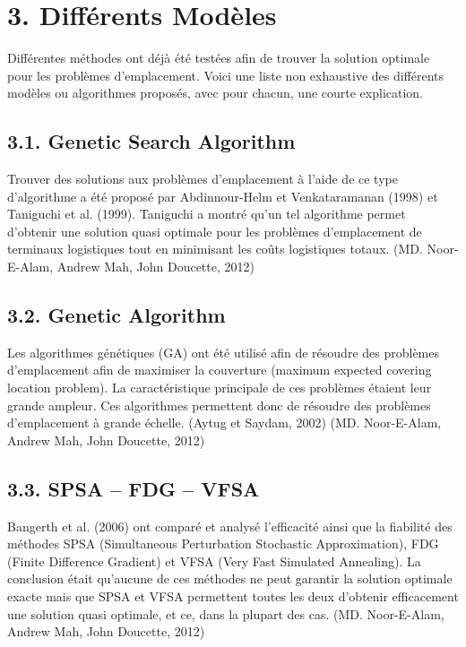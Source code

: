 \section*{3. Différents Modèles}

\bigskip

Différentes méthodes ont déjà été testées afin de trouver la solution optimale pour les problèmes d'emplacement. Voici une liste non exhaustive des différents modèles ou algorithmes proposés, avec pour chacun, une courte explication.

\subsection*{3.1. Genetic Search Algorithm}

\bigskip

Trouver des solutions aux problèmes d'emplacement à l'aide de ce type d'algorithme a été proposé par Abdinnour-Helm et Venkataramanan (1998) et Taniguchi et al. (1999). Taniguchi a montré qu'un tel algorithme permet d'obtenir une solution quasi optimale pour les problèmes d'emplacement de terminaux logistiques tout en minimisant les coûts logistiques totaux. (MD. Noor-E-Alam, Andrew Mah, John Doucette, 2012)

\subsection*{3.2. Genetic Algorithm}

\bigskip

Les algorithmes génétiques (GA) ont été utilisé afin de résoudre des problèmes d'emplacement afin de maximiser la couverture (maximum expected covering location problem). La caractéristique principale de ces problèmes étaient leur grande ampleur. Ces algorithmes permettent donc de résoudre des problèmes d'emplacement à grande échelle. (Aytug et Saydam, 2002) (MD. Noor-E-Alam, Andrew Mah, John Doucette, 2012)

\subsection*{3.3. SPSA – FDG – VFSA}

\bigskip

Bangerth et al. (2006) ont comparé et analysé l'efficacité ainsi que la fiabilité des méthodes SPSA (Simultaneous Perturbation Stochastic Approximation), FDG (Finite Difference Gradient) et VFSA (Very Fast Simulated Annealing). La conclusion était qu'aucune de ces méthodes ne peut garantir la solution optimale exacte mais que SPSA et VFSA permettent toutes les deux d'obtenir efficacement une solution quasi optimale, et ce, dans la plupart des cas. (MD. Noor-E-Alam, Andrew Mah, John Doucette, 2012)

